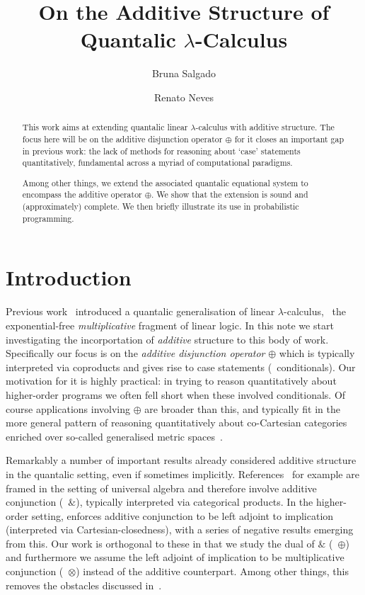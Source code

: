 \documentclass[a4paper,UKenglish,cleveref, autoref, thm-restate]{lipics-v2021}
\title{On the Additive Structure of Quantalic $\lambda$-Calculus} %
\author{Bruna Salgado}{University of Minho and INESC-TEC, Portugal }{johnqpublic@dummyuni.org}{https://orcid.org/0000-0002-1825-0097}{}%
\author{Renato Neves}{University of Minho and INESC-TEC, Portugal}{nevrenato@di.uminho.pt}{https://orcid.org/0000-0002-8787-2551}{}
\begin{document}
\maketitle

\begin{abstract}

This work aims at extending quantalic linear $\lambda$-calculus with additive
structure. The focus here will be on the additive disjunction operator $\oplus$
for it closes an important gap in previous work: the lack of methods for
reasoning about `case' statements  quantitatively, fundamental across a myriad
of computational paradigms. 

Among other things, we extend the associated quantalic equational system to
encompass the additive operator $\oplus$. We show that the extension is sound
and (approximately) complete. We then briefly illustrate its use in
probabilistic programming.

\end{abstract}

\section{Introduction}
\label{sec:intro}

Previous work~\cite{dahlqvist22,dahlqvist2023syntactic} introduced a quantalic
generalisation of linear $\lambda$-calculus, \ie\ the exponential-free
\emph{multiplicative} fragment of linear logic. In this note we start
investigating the incorportation of \emph{additive} structure to this body of
work. Specifically our focus is on the \emph{additive disjunction operator}
$\oplus$ which is typically interpreted via coproducts and gives rise to case
statements (\ie\ conditionals). Our motivation for it is highly practical: in
trying to reason quantitatively about higher-order programs we often fell short
when these involved conditionals. Of course applications involving $\oplus$ are
broader than this, and typically fit in the more general pattern of reasoning
quantitatively about co-Cartesian categories enriched over so-called
generalised metric spaces~\cite{paseka00}.

Remarkably a number of important results already considered additive structure
in the quantalic setting, even if sometimes implicitly.
References~\cite{mardare2016quantitative,mardare2017axiomatizability,mio24,jurka24}
for example are framed in the setting of universal algebra and therefore
involve additive conjunction (\ie\ $\&$), typically interpreted via categorical
products.  In the higher-order setting, \cite{lago22} enforces additive
conjunction to be left adjoint to implication (interpreted via
Cartesian-closedness), with a series of negative results emerging from this.
Our work is orthogonal to these in that we study the dual of $\&$ (\ie\
$\oplus$) and furthermore we assume the left adjoint of implication to be
multiplicative conjunction (\ie\ $\otimes$) instead of the additive
counterpart. Among other things, this removes the obstacles discussed
in~\cite{lago22}.
\end{document}
